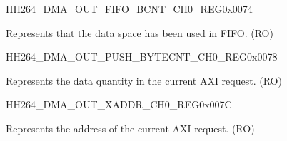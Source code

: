     
    \begin{register}{H}{H264\_DMA\_OUT\_FIFO\_BCNT\_CH0\_REG}{0x0074}\label{regdesc:H264DMAOUTFIFOBCNTCH0REG}
    \regnewline%
    \begin{regdesc}\begin{reglist}
    \label{fielddesc:H264DMAOUTCMDFIFOOUTFIFOBCNTCH0}\item [H264\_DMA\_OUT\_CMDFIFO\_OUTFIFO\_BCNT\_CH0] Represents that the data space has been used in FIFO. (RO)
    \end{reglist}\end{regdesc}
    \end{register}
    
    
    \begin{register}{H}{H264\_DMA\_OUT\_PUSH\_BYTECNT\_CH0\_REG}{0x0078}\label{regdesc:H264DMAOUTPUSHBYTECNTCH0REG}
    \regnewline%
    \begin{regdesc}\begin{reglist}
    \label{fielddesc:H264DMAOUTCMDFIFOPUSHBYTECNTCH0}\item [H264\_DMA\_OUT\_CMDFIFO\_PUSH\_BYTECNT\_CH0] Represents the data quantity in the current AXI request. (RO)
    \end{reglist}\end{regdesc}
    \end{register}
    
    
    \begin{register}{H}{H264\_DMA\_OUT\_XADDR\_CH0\_REG}{0x007C}\label{regdesc:H264DMAOUTXADDRCH0REG}
    \regnewline%
    \begin{regdesc}\begin{reglist}
    \label{fielddesc:H264DMAOUTCMDFIFOXADDRCH0}\item [H264\_DMA\_OUT\_CMDFIFO\_XADDR\_CH0] Represents the address of the current AXI request. (RO)
    \end{reglist}\end{regdesc}
    \end{register}
    
